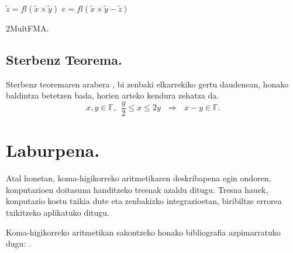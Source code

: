 \begin{algorithm}[H]
 \BlankLine
 {$\tilde{z}=fl(\tilde{x}\times\tilde{y})$\;
  $e=fl(\tilde{x}\times\tilde{y}- \tilde{z})$\;
 }
 \BlankLine
 \caption{2MultFMA.}
 \label{alg:2MultFMA}
\end{algorithm}

\subsection*{Sterbenz Teorema.}
Sterbenz teoremaren arabera \cite{Sterbenz1973}, bi zenbaki elkarrekiko  gertu daudenean, honako baldintza betetzen bada, horien arteko kendura zehatza da.
\begin{equation}
\label{eq:4311}
x,y \in \mathbb{F}, \ \ \frac{y}{2}\leq x \leq 2y \ \ \ \Rightarrow \ \ \ x-y\in \mathbb{F}.
\end{equation}


\section{Laburpena.}

Atal honetan, koma-higikorreko aritmetikaren deskribapena egin ondoren, konputazioen doitasuna handitzeko tresnak azaldu ditugu. Tresna hauek, konputazio kostu txikia dute eta zenbakizko integrazioetan, biribiltze errorea txikitzeko aplikatuko ditugu.  

Koma-higikorreko aritmetikan sakontzeko honako bibliografia azpimarratuko dugu: \cite{Overton2001,Muller2009,Higham2002,Corless2013}.

